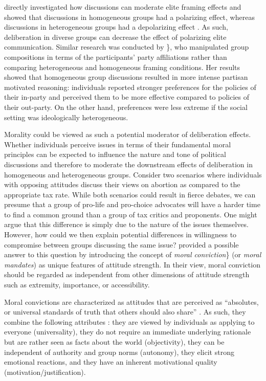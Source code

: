 \documentclass[11pt,]{article}
\begin{document}
\citet{druckman2003framing} directly investigated how discussions can
moderate elite framing effects and showed that discussions in
homogeneous groups had a polarizing effect, whereas discussions in
heterogeneous groups had a depolarizing effect \citep[see
also][]{druckman2004political}. As such, deliberation in diverse groups
can decrease the effect of polarizing elite communication. Similar
research was conducted by \citet{klar2014partisanship}\}, who
manipulated group compositions in terms of the participants' party
affiliations rather than comparing heterogeneous and homogeneous framing
conditions. Her results showed that homogeneous group discussions
resulted in more intense partisan motivated reasoning: individuals
reported stronger preferences for the policies of their in-party and
perceived them to be more effective compared to policies of their
out-party. On the other hand, preferences were less extreme if the
social setting was ideologically heterogeneous.

Morality could be viewed as such a potential moderator of deliberation
effects. Whether individuals perceive issues in terms of their
fundamental moral principles can be expected to influence the nature and
tone of political discussions and therefore to moderate the downstream
effects of deliberation in homogeneous and heterogeneous groups.
Consider two scenarios where individuals with opposing attitudes discuss
their views on abortion as compared to the appropriate tax rate. While
both scenarios could result in fierce debates, we can presume that a
group of pro-life and pro-choice advocates will have a harder time to
find a common ground than a group of tax critics and proponents. One
might argue that this difference is simply due to the nature of the
issues themselves. However, how could we then explain potential
differences in willingness to compromise between groups discussing the
same issue? \citet{skitka2005moral} provided a possible answer to this
question by introducing the concept of \emph{moral conviction}\} (or
\emph{moral mandates}) as unique features of attitude strength. In their
view, moral conviction should be regarded as independent from other
dimensions of attitude strength such as extremity, importance, or
accessibility.

Moral convictions are characterized as attitudes that are perceived as
``absolutes, or universal standards of truth that others should also
share'' \citep[269]{skitka2010psychology}. As such, they combine the
following attributes \citep{skitka2010psychology}: they are viewed by
individuals as applying to everyone (universality), they do not require
an immediate underlying rationale but are rather seen as facts about the
world (objectivity), they can be independent of authority and group
norms (autonomy), they elicit strong emotional reactions, and they have
an inherent motivational quality (motivation/justification).
\end{document}
